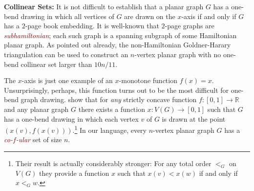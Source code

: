 \documentclass[a4paper,UKenglish,cleveref, autoref, thm-restate]{lipics-v2021}
\newcommand{\R}{\mathbb{R}}
\newcommand{\defin}[1]{\emph{\textcolor{Maroon}{#1}}}
\begin{document}
\noindent\textbf{Collinear Sets:}
It is not difficult to establish that a planar graph $G$ has a one-bend drawing in which all vertices of $G$ are drawn on the $x$-axis if and only if $G$ has a $2$-page book embedding. It is well-known that $2$-page graphs are \defin{subhamiltonian}; each such graph is a spanning subgraph of some Hamiltonian planar graph. As pointed out already, the non-Hamiltonian Goldner-Harary triangulation can be used to construct an $n$-vertex planar graph with no one-bend collinear set larger than $10n/11$.

The $x$-axis is just one example of an $x$-monotone function $f(x)=x$. Unsurprisingly, perhaps, this function turns out to be the most difficult for one-bend graph drawing.
\citet{DBLP:journals/comgeo/GiacomoDLW05} show that for \emph{any} strictly concave function $f:[0,1]\to\R$ and any planar graph $G$ there exists a function $x:V(G)\to[0,1]$ such that $G$
has a one-bend drawing in which each vertex $v$ of $G$ is drawn at the point $(x(v),f(x(v)))$.\footnote{Their result is actually considerably stronger: For any total order $<_G$ on $V(G)$ they provide a function $x$ such that $x(v) < x(w)$ if and only if $x<_G w$.}
  In our language, every $n$-vertex planar graph $G$ has a \defin{co-$f$-ular} set of size $n$.

\end{document}
